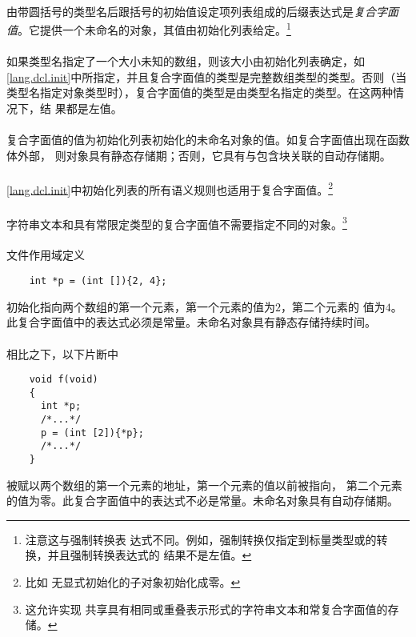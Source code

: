 \semantic
\paragraph{}
由带圆括号的类型名后跟括号的初始值设定项列表组成的后缀表达式是\textit{复合字面
值}。它提供一个未命名的对象，其值由初始化列表给定。\footnote{注意这与强制转换表
达式不同。例如，强制转换仅指定到标量类型或的转换，并且强制转换表达式的
结果不是左值。}

\paragraph{}
如果类型名指定了一个大小未知的数组，则该大小由初始化列表确定，如
\ref{lang.dcl.init}中所指定，并且复合字面值的类型是完整数组类型的类型。否则（当
类型名指定对象类型时），复合字面值的类型是由类型名指定的类型。在这两种情况下，结
果都是左值。

\paragraph{}
复合字面值的值为初始化列表初始化的未命名对象的值。如复合字面值出现在函数体外部，
则对象具有静态存储期；否则，它具有与包含块关联的自动存储期。

\paragraph{}
\ref{lang.dcl.init}中初始化列表的所有语义规则也适用于复合字面值。\footnote{比如
无显式初始化的子对象初始化成零。}

\paragraph{}
字符串文本和具有常限定类型的复合字面值不需要指定不同的对象。\footnote{这允许实现
共享具有相同或重叠表示形式的字符串文本和常复合字面值的存储。}

\paragraph{}
\ex 文件作用域定义
\begin{lstlisting}
    int *p = (int []){2, 4};
\end{lstlisting}
初始化指向两个数组的第一个元素，第一个元素的值为$2$，第二个元素的
值为$4$。此复合字面值中的表达式必须是常量。未命名对象具有静态存储持续时间。

\paragraph{}
\ex 相比之下，以下片断中
\begin{lstlisting}
    void f(void)
    {
      int *p;
      /*...*/
      p = (int [2]){*p};
      /*...*/
    }
\end{lstlisting}
被赋以两个数组的第一个元素的地址，第一个元素的值以前被指向，
第二个元素的值为零。此复合字面值中的表达式不必是常量。未命名对象具有自动存储期。

